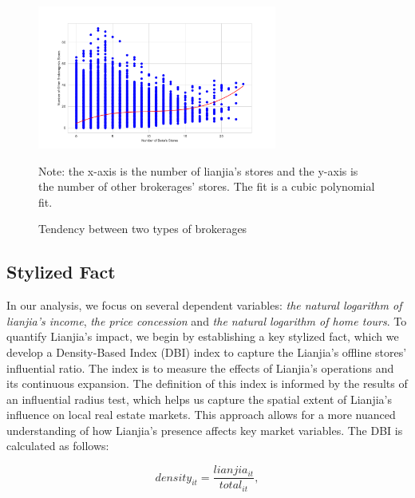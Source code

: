 \documentclass[12pt]{article}
\begin{document}
\begin{figure}
    \centering
    \includegraphics[width=0.7\textwidth]{../figures/scatter_plot_with_two_brokerages.pdf}
    \caption{Tendency between two types of brokerages}
    \label{fig:same_distribution}
    Note: the x-axis is the number of lianjia's stores and the y-axis is the number of other brokerages' stores. The fit is a cubic polynomial fit.
\end{figure}



\subsection{Stylized Fact} \label{subsec:stylized_fact}

In our analysis, we focus on several dependent variables: \emph{the natural logarithm of lianjia's income}, \emph{the price concession} and \emph{the natural logarithm of home tours}. To quantify Lianjia's impact, we begin by establishing a key stylized fact, which we develop a Density-Based Index (DBI) index to capture the Lianjia's offline stores' influential ratio. The index is to measure the effects of Lianjia's operations and its continuous expansion. The definition of this index is informed by the results of an influential radius test, which helps us capture the spatial extent of Lianjia's influence on local real estate markets. This approach allows for a more nuanced understanding of how Lianjia's presence affects key market variables. The DBI is calculated as follows:

\begin{equation*}
  density_{it} = \frac{lianjia_{it}}{total_{it}},
\end{equation*}
\end{document}
